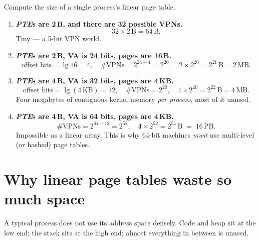 \documentclass[11pt,a4paper]{article}
\newcommand{\pte}{\textit{PTE}}
\begin{document}
\begin{quizbox}
Compute the size of a single process's linear page table.
\end{quizbox}

\begin{solbox}
\begin{enumerate}[leftmargin=1.4em]
  \item \textbf{\pte s are 2\,B, and there are 32 possible VPNs.}
  \[
    32 \times 2\,\text{B} = 64\,\text{B}.
  \]
  Tiny --- a 5-bit VPN world.

  \item \textbf{\pte s are 2\,B, VA is 24 bits, pages are 16\,B.}
  \[
    \text{offset bits}=\lg 16=4,
    \quad
    \#\text{VPNs}=2^{24-4}=2^{20},
    \quad
    2 \times 2^{20} = 2^{21}\,\text{B} = 2\,\text{MB}.
  \]

  \item \textbf{\pte s are 4\,B, VA is 32 bits, pages are 4\,KB.}
  \[
    \text{offset bits}=\lg(4\,\text{KB})=12,
    \quad
    \#\text{VPNs}=2^{20},
    \quad
    4 \times 2^{20} = 2^{22}\,\text{B} = 4\,\text{MB}.
  \]
  Four megabytes of contiguous kernel memory \emph{per process}, most of
  it unused.

  \item \textbf{\pte s are 4\,B, VA is 64 bits, pages are 4\,KB.}
  \[
    \#\text{VPNs}=2^{64-12}=2^{52},
    \quad
    4 \times 2^{52} = 2^{54}\,\text{B}
    \;=\; 16\,\text{PB}.
  \]
  Impossible as a linear array. This is why 64-bit machines \emph{must}
  use multi-level (or hashed) page tables.
\end{enumerate}
\end{solbox}

\section{Why linear page tables waste so much space}

A typical process does not use its address space densely. Code and heap
sit at the low end; the stack sits at the high end; almost everything
in between is unused.
\end{document}
